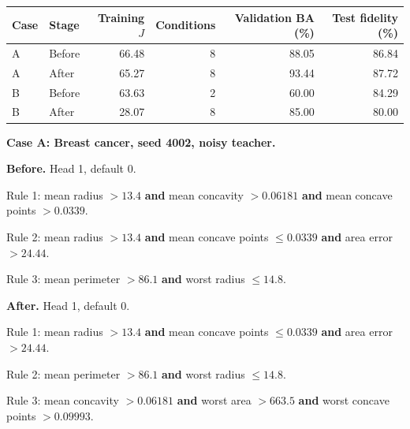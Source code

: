 \begin{kbtable}
\centering
\caption{Two post-hoc illustrations from the new eight-condition cohort: one positive and one negative held-out repair change, preferring breast-cancer features and then larger normalized training gain. The exported programs match saved selected models. Thresholds are shown to seven significant digits; full precision is retained in the supplement. Ionosphere feature indices are zero based. These examples are not independent validation.}
\label{tab:repair_cases}
\small
\begin{tabular}{llrrrr}
\toprule
Case & Stage & Training $J$ & Conditions & Validation BA (\%) & Test fidelity (\%) \\
\midrule
A & Before & 66.48 & 8 & 88.05 & 86.84 \\
A & After & 65.27 & 8 & 93.44 & 87.72 \\
B & Before & 63.63 & 2 & 60.00 & 84.29 \\
B & After & 28.07 & 8 & 85.00 & 80.00 \\
\bottomrule
\end{tabular}
\par\medskip
\begin{minipage}[t]{0.48\linewidth}\raggedright\small
\textbf{Case A: Breast cancer, seed 4002, noisy teacher.}\par\smallskip
\textbf{Before.} Head 1, default 0.\par Rule 1: mean radius \(> 13.4\) \textbf{and} mean concavity \(> 0.06181\) \textbf{and} mean concave points \(> 0.0339\).\par Rule 2: mean radius \(> 13.4\) \textbf{and} mean concave points \(\leq 0.0339\) \textbf{and} area error \(> 24.44\).\par Rule 3: mean perimeter \(> 86.1\) \textbf{and} worst radius \(\leq 14.8\).\par\smallskip
\textbf{After.} Head 1, default 0.\par Rule 1: mean radius \(> 13.4\) \textbf{and} mean concave points \(\leq 0.0339\) \textbf{and} area error \(> 24.44\).\par Rule 2: mean perimeter \(> 86.1\) \textbf{and} worst radius \(\leq 14.8\).\par Rule 3: mean concavity \(> 0.06181\) \textbf{and} worst area \(> 663.5\) \textbf{and} worst concave points \(> 0.09993\).\par\smallskip
\end{minipage}\hfill
\begin{minipage}[t]{0.48\linewidth}\raggedright\small

\end{minipage}
\end{kbtable}

